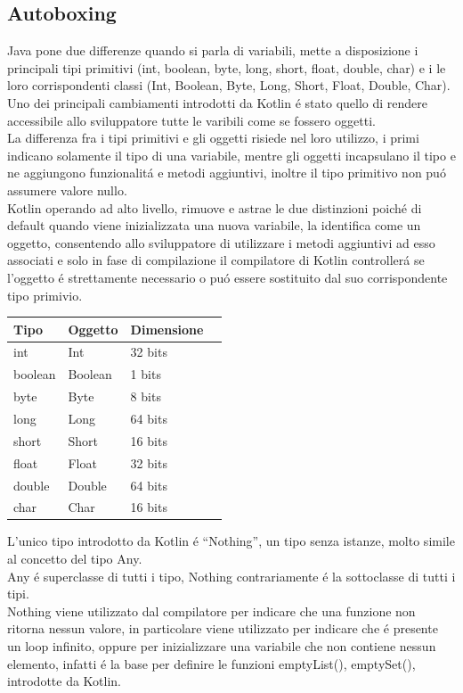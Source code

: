 \subsection{Autoboxing}


Java pone due differenze quando si parla di variabili, mette a disposizione i principali tipi primitivi (int, boolean, byte, long, short, float, double, char) e i le loro corrispondenti classi (Int, Boolean, Byte, Long, Short, Float, Double, Char).\\
Uno dei principali cambiamenti introdotti da Kotlin \'e stato quello di rendere accessibile allo sviluppatore tutte le varibili come se fossero oggetti.\\
La differenza fra i tipi primitivi e gli oggetti risiede nel loro utilizzo, i primi indicano solamente il tipo di una variabile, mentre gli oggetti incapsulano il tipo e ne aggiungono funzionalit\'a e metodi aggiuntivi, inoltre il tipo primitivo non pu\'o assumere valore nullo. \\
Kotlin operando ad alto livello, rimuove e astrae le due distinzioni poich\'e di default quando viene inizializzata una nuova variabile, la identifica come un oggetto, consentendo allo sviluppatore di utilizzare i metodi aggiuntivi ad esso associati e solo in fase di compilazione il compilatore di Kotlin controller\'a se l'oggetto \'e strettamente necessario o pu\'o essere sostituito dal suo corrispondente tipo primivio.

\begin{center}
    \begin{tabular}{ | l | l | l | p{5cm} |}
    \hline
    Tipo & Oggetto & Dimensione \\ \hline
    int & Int & 32 bits\\ \hline
    boolean & Boolean & 1 bits\\ \hline
    byte & Byte & 8 bits\\ \hline
    long & Long & 64 bits\\ \hline
    short & Short & 16 bits\\ \hline
    float & Float & 32 bits\\ \hline
    double & Double & 64 bits\\ \hline
    char & Char & 16 bits\\ \hline

    \end{tabular}
\end{center}
L'unico tipo introdotto da Kotlin \'e ``Nothing'', un tipo senza istanze, molto simile al concetto del tipo Any.\\
Any \'e superclasse di tutti i tipo, Nothing contrariamente \'e la sottoclasse di tutti i tipi.\\
Nothing viene utilizzato dal compilatore per indicare che una funzione non ritorna nessun valore, in particolare viene utilizzato per indicare che \'e presente un loop infinito, oppure per inizializzare una variabile che non contiene nessun elemento, infatti \'e la base per definire le funzioni emptyList(), emptySet(), introdotte da Kotlin.


